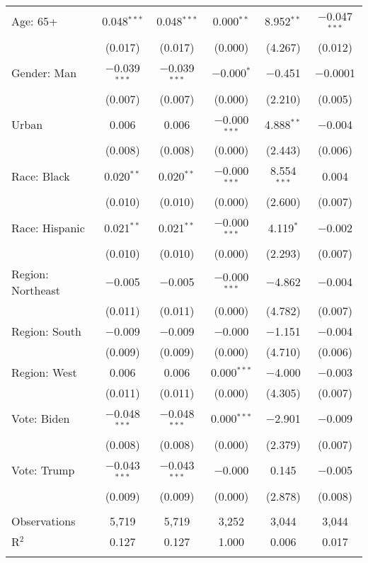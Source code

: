 \begin{tabular}{@{\extracolsep{5pt}}lccccc}
  Age: 65+ & 0.048$^{***}$ & 0.048$^{***}$ & 0.000$^{**}$ & 8.952$^{**}$ & $-$0.047$^{***}$ \\ 
  & (0.017) & (0.017) & (0.000) & (4.267) & (0.012) \\ 
  Gender: Man & $-$0.039$^{***}$ & $-$0.039$^{***}$ & $-$0.000$^{*}$ & $-$0.451 & $-$0.0001 \\ 
  & (0.007) & (0.007) & (0.000) & (2.210) & (0.005) \\ 
  Urban & 0.006 & 0.006 & $-$0.000$^{***}$ & 4.888$^{**}$ & $-$0.004 \\ 
  & (0.008) & (0.008) & (0.000) & (2.443) & (0.006) \\ 
  Race: Black & 0.020$^{**}$ & 0.020$^{**}$ & $-$0.000$^{***}$ & 8.554$^{***}$ & 0.004 \\ 
  & (0.010) & (0.010) & (0.000) & (2.600) & (0.007) \\ 
  Race: Hispanic & 0.021$^{**}$ & 0.021$^{**}$ & $-$0.000$^{***}$ & 4.119$^{*}$ & $-$0.002 \\ 
  & (0.010) & (0.010) & (0.000) & (2.293) & (0.007) \\ 
  Region: Northeast & $-$0.005 & $-$0.005 & $-$0.000$^{***}$ & $-$4.862 & $-$0.004 \\ 
  & (0.011) & (0.011) & (0.000) & (4.782) & (0.007) \\ 
  Region: South & $-$0.009 & $-$0.009 & $-$0.000 & $-$1.151 & $-$0.004 \\ 
  & (0.009) & (0.009) & (0.000) & (4.710) & (0.006) \\ 
  Region: West & 0.006 & 0.006 & 0.000$^{***}$ & $-$4.000 & $-$0.003 \\ 
  & (0.011) & (0.011) & (0.000) & (4.305) & (0.007) \\ 
  Vote: Biden & $-$0.048$^{***}$ & $-$0.048$^{***}$ & 0.000$^{***}$ & $-$2.901 & $-$0.009 \\ 
  & (0.008) & (0.008) & (0.000) & (2.379) & (0.007) \\ 
  Vote: Trump & $-$0.043$^{***}$ & $-$0.043$^{***}$ & $-$0.000 & 0.145 & $-$0.005 \\ 
  & (0.009) & (0.009) & (0.000) & (2.878) & (0.008) \\ 
 \hline \\[-1.8ex] 

Observations & 5,719 & 5,719 & 3,252 & 3,044 & 3,044 \\ 
R$^{2}$ & 0.127 & 0.127 & 1.000 & 0.006 & 0.017 \\ 
\hline 
\hline \\[-1.8ex] 
\end{tabular} 